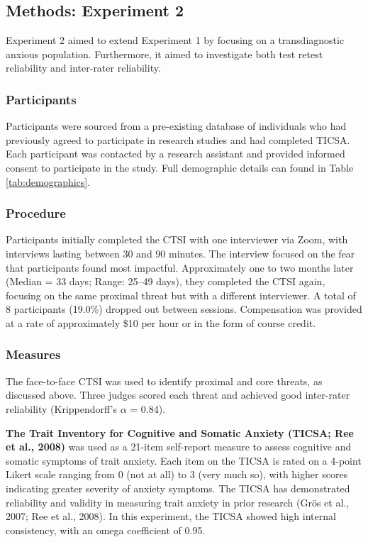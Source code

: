 \documentclass[
  man,floatsintext]{apa7}
\begin{document}
\subsection{Methods: Experiment 2}\label{methods-experiment-2}

Experiment 2 aimed to extend Experiment 1 by focusing on a transdiagnostic anxious population.
Furthermore, it aimed to investigate both test retest reliability and inter-rater reliability.

\subsubsection{Participants}\label{participants-1}

Participants were sourced from a pre-existing database of individuals who had previously agreed to participate in research studies and had completed TICSA.
Each participant was contacted by a research assistant and provided informed consent to participate in the study.
Full demographic details can found in Table \ref{tab:demographics}.

\subsubsection{Procedure}\label{procedure-1}

Participants initially completed the CTSI with one interviewer via Zoom, with interviews lasting between 30 and 90 minutes.
The interview focused on the fear that participants found most impactful.
Approximately one to two months later (Median = 33 days; Range: 25--49 days), they completed the CTSI again, focusing on the same proximal threat but with a different interviewer.
A total of 8 participants (19.0\%) dropped out between sessions.
Compensation was provided at a rate of approximately \$10 per hour or in the form of course credit.

\subsubsection{Measures}\label{measures-2}

The face-to-face CTSI was used to identify proximal and core threats, as discussed above.
Three judges scored each threat and achieved good inter-rater reliability (Krippendorff's \(\alpha\) = 0.84).

\textbf{The Trait Inventory for Cognitive and Somatic Anxiety (TICSA; Ree et al., 2008)} was used as a 21-item self-report measure to assess cognitive and somatic symptoms of trait anxiety.
Each item on the TICSA is rated on a 4-point Likert scale ranging from 0 (not at all) to 3 (very much so), with higher scores indicating greater severity of anxiety symptoms.
The TICSA has demonstrated reliability and validity in measuring trait anxiety in prior research (Grös et al., 2007; Ree et al., 2008).
In this experiment, the TICSA showed high internal consistency, with an omega coefficient of 0.95.
\end{document}
